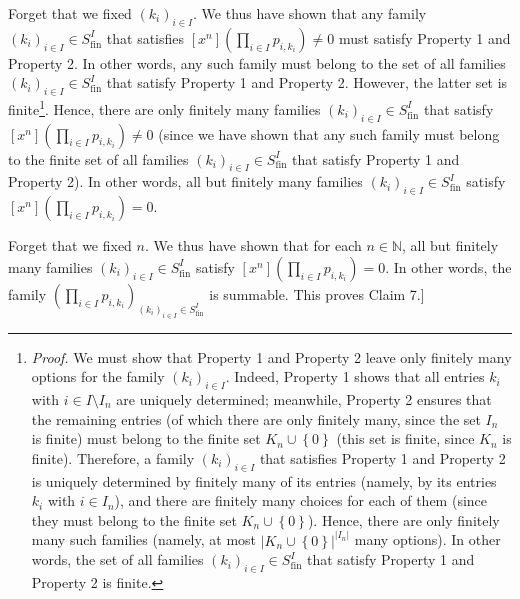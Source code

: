 Forget that we fixed $\left(  k_{i}\right)  _{i\in I}$. We thus have shown
that any family $\left(  k_{i}\right)  _{i\in I}\in S_{\operatorname*{fin}%
}^{I}$ that satisfies $\left[  x^{n}\right]  \left(  \prod_{i\in I}p_{i,k_{i}%
}\right)  \neq0$ must satisfy Property 1 and Property 2. In other words, any
such family must belong to the set of all families $\left(  k_{i}\right)
_{i\in I}\in S_{\operatorname*{fin}}^{I}$ that satisfy Property 1 and Property
2. However, the latter set is finite\footnote{\textit{Proof.} We must show
that Property 1 and Property 2 leave only finitely many options for the family
$\left(  k_{i}\right)  _{i\in I}$. Indeed, Property 1 shows that all entries
$k_{i}$ with $i\in I\setminus I_{n}$ are uniquely determined; meanwhile,
Property 2 ensures that the remaining entries (of which there are only
finitely many, since the set $I_{n}$ is finite) must belong to the finite set
$K_{n}\cup\left\{  0\right\}  $ (this set is finite, since $K_{n}$ is finite).
Therefore, a family $\left(  k_{i}\right)  _{i\in I}$ that satisfies Property
1 and Property 2 is uniquely determined by finitely many of its entries
(namely, by its entries $k_{i}$ with $i\in I_{n}$), and there are finitely
many choices for each of them (since they must belong to the finite set
$K_{n}\cup\left\{  0\right\}  $). Hence, there are only finitely many such
families (namely, at most $\left\vert K_{n}\cup\left\{  0\right\}  \right\vert
^{\left\vert I_{n}\right\vert }$ many options). In other words, the set of all
families $\left(  k_{i}\right)  _{i\in I}\in S_{\operatorname*{fin}}^{I}$ that
satisfy Property 1 and Property 2 is finite.}. Hence, there are only finitely
many families $\left(  k_{i}\right)  _{i\in I}\in S_{\operatorname*{fin}}^{I}$
that satisfy $\left[  x^{n}\right]  \left(  \prod_{i\in I}p_{i,k_{i}}\right)
\neq0$ (since we have shown that any such family must belong to the finite set
of all families $\left(  k_{i}\right)  _{i\in I}\in S_{\operatorname*{fin}%
}^{I}$ that satisfy Property 1 and Property 2). In other words, all but
finitely many families $\left(  k_{i}\right)  _{i\in I}\in
S_{\operatorname*{fin}}^{I}$ satisfy $\left[  x^{n}\right]  \left(
\prod_{i\in I}p_{i,k_{i}}\right)  =0$.

Forget that we fixed $n$. We thus have shown that for each $n\in\mathbb{N}$,
all but finitely many families $\left(  k_{i}\right)  _{i\in I}\in
S_{\operatorname*{fin}}^{I}$ satisfy $\left[  x^{n}\right]  \left(
\prod_{i\in I}p_{i,k_{i}}\right)  =0$. In other words, the family $\left(
\prod_{i\in I}p_{i,k_{i}}\right)  _{\left(  k_{i}\right)  _{i\in I}\in
S_{\operatorname*{fin}}^{I}}$ is summable. This proves Claim 7.]

